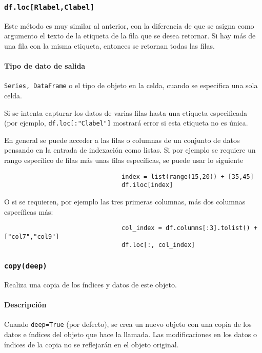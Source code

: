         \subsubsection{\texttt{df.loc[Rlabel,Clabel]}} Este método es muy similar al anterior, con la diferencia de que se asigna como argumento el texto de la etiqueta de la fila que se desea retornar. Si hay más de una fila con la misma etiqueta, entonces se retornan todas las filas.

        \paragraph{Tipo de dato de salida} \texttt{Series, DataFrame} o el tipo de objeto en la celda, cuando se especifica una sola celda.

        Si se intenta capturar los datos de varias filas hasta una etiqueta especificada (por ejemplo, \texttt{df.loc[:"Clabel"]} mostrará error si esta etiqueta no es única.


        En general se puede acceder a las filas o columnas de un conjunto de datos pensando en la entrada de indexación como listas. Si por ejemplo se requiere un rango específico de filas más unas filas específicas, se puede usar lo siguiente

        \begin{verbatim}
                                index = list(range(15,20)) + [35,45]
                                df.iloc[index]
                                \end{verbatim}
        O si se requieren, por ejemplo las tres primeras columnas, más dos columnas específicas más:
        \begin{verbatim}
                                col_index = df.columns[:3].tolist() + ["col7","col9"]
                                df.loc[:, col_index]
                                \end{verbatim}


        \subsubsection{\texttt{copy(deep)}} Realiza una copia de los índices y datos de este objeto.

        \paragraph{\textbf{Descripción}}
        Cuando \texttt{deep=True} (por defecto), se crea un nuevo objeto con una copia de los datos e índices del objeto que hace la llamada. Las modificaciones en los datos o índices de la copia no se reflejarán en el objeto original.

